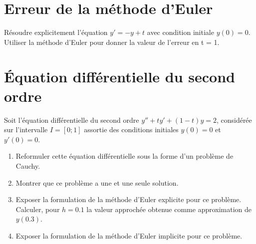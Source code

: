 \documentclass[a4paper]{article}
\begin{document}
\section{Erreur de la méthode d'Euler}
Résoudre explicitement l'équation $y'=-y+t$ avec condition initiale $y(0) = 0$. Utiliser la méthode d'Euler pour donner la valeur de l'erreur en t = 1.
%

\section{Équation différentielle du second ordre}
 Soit l'équation différentielle du second ordre $y'' + ty' + (1 - t)y = 2$, considérée
sur l'intervalle $I = [0; 1]$ assortie des conditions initiales $y(0) = 0$ et $y'(0) = 0$.
\begin{enumerate}
\item  Reformuler cette équation différentielle sous la forme d'un problème de Cauchy.
\item Montrer que ce problème a une et une seule solution.
\item Exposer la formulation de la méthode d'Euler explicite pour ce problème. Calculer, pour $h = 0.1$ la valeur approchée obtenue comme approximation de $y(0.3)$.
\item Exposer la formulation de la méthode d'Euler implicite pour ce problème.
\end{enumerate}
\end{document}
